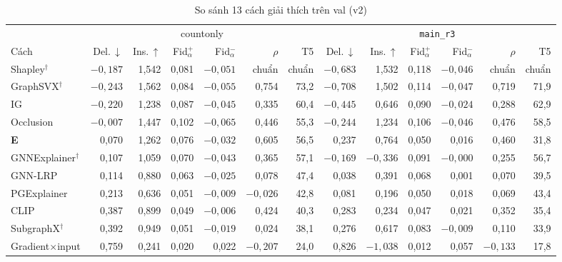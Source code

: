 \begin{table}[t]
  \caption{So sánh 13 cách giải thích trên val (v2)}
  \label{tab:xai-explainers}
  \centering
  \footnotesize
  \setlength{\tabcolsep}{3pt}
  \begin{tabular*}{\textwidth}{@{\extracolsep{\fill}}lrrrrrrrrrrrr@{}}
    \toprule
    & \multicolumn{6}{c}{countonly} & \multicolumn{6}{c}{\texttt{main\_r3}} \\
    \cmidrule{2-7}\cmidrule{8-13}
    Cách & Del.\,$\downarrow$ & Ins.\,$\uparrow$ & Fid$_{\alpha}^{+}$ & Fid$_{\alpha}^{-}$ & $\rho$ & T5
         & Del.\,$\downarrow$ & Ins.\,$\uparrow$ & Fid$_{\alpha}^{+}$ & Fid$_{\alpha}^{-}$ & $\rho$ & T5 \\
    \midrule
    Shapley$^{\dagger}$ & $-0{,}187$ & 1,542 & 0,081 & $-0{,}051$ & chuẩn & chuẩn & $-0{,}683$ & 1,532 & 0,118 & $-0{,}046$ & chuẩn & chuẩn \\
    GraphSVX$^{\dagger}$ & $-0{,}243$ & 1,562 & 0,084 & $-0{,}055$ & 0,754 & 73,2 & $-0{,}708$ & 1,502 & 0,114 & $-0{,}047$ & 0,719 & 71,9 \\
    IG & $-0{,}220$ & 1,238 & 0,087 & $-0{,}045$ & 0,335 & 60,4 & $-0{,}445$ & 0,646 & 0,090 & $-0{,}024$ & 0,288 & 62,9 \\
    Occlusion & $-0{,}007$ & 1,447 & 0,102 & $-0{,}065$ & 0,446 & 55,3 & $-0{,}244$ & 1,234 & 0,106 & $-0{,}046$ & 0,476 & 58,5 \\
    \textbf{E} & 0,070 & 1,262 & 0,076 & $-0{,}032$ & 0,605 & 56,5 & 0,237 & 0,764 & 0,050 & 0,016 & 0,460 & 31,8 \\
    GNNExplainer$^{\dagger}$ & 0,107 & 1,059 & 0,070 & $-0{,}043$ & 0,365 & 57,1 & $-0{,}169$ & $-0{,}336$ & 0,091 & $-0{,}000$ & 0,255 & 56,7 \\
    GNN-LRP & 0,114 & 0,880 & 0,063 & $-0{,}025$ & 0,078 & 47,4 & 0,038 & 0,391 & 0,068 & 0,001 & 0,070 & 39,5 \\
    PGExplainer & 0,213 & 0,636 & 0,051 & $-0{,}009$ & $-0{,}026$ & 42,8 & 0,081 & 0,196 & 0,050 & 0,018 & 0,069 & 43,4 \\
    CLIP & 0,387 & 0,899 & 0,049 & $-0{,}006$ & 0,424 & 40,3 & 0,283 & 0,234 & 0,047 & 0,021 & 0,352 & 35,4 \\
    SubgraphX$^{\dagger}$ & 0,392 & 0,949 & 0,051 & $-0{,}019$ & 0,024 & 38,1 & 0,276 & 0,617 & 0,083 & $-0{,}009$ & 0,110 & 33,9 \\
    Gradient$\times$input & 0,759 & 0,241 & 0,020 & 0,022 & $-0{,}207$ & 24,0 & 0,826 & $-1{,}038$ & 0,012 & 0,057 & $-0{,}133$ & 17,8 \\

\end{tabular*}
\end{table}
